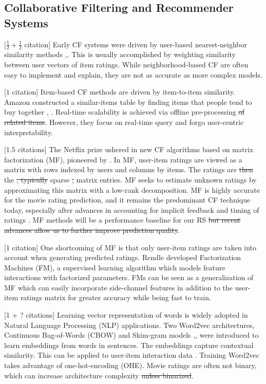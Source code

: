 \subsection{Collaborative Filtering and Recommender Systems}

[$ \frac{1}{2} + \frac{1}{2} $ citation] Early CF systems were driven by user-based nearest-neighbor similarity methods \cite{herlocker1999algorithmic},\cite{smith2017two}. This is usually accomplished by weighting similarity between user vectors of item ratings. While neighborhood-based CF are often easy to implement and explain, they are not as accurate as more complex models.

[$1$ citation] Item-based CF methods are driven by item-to-item similarity. Amazon constructed a similar-items table by finding items that people tend to buy together \cite{linden2003amazon}, \cite{smith2017two}. Real-time scalability is achieved via offline pre-processing\st{ of related items}. However, they focus on real-time query and forgo user-centric interpretability. 

[$1.5$ citations] The Netflix prize ushered in new CF algorithms based on matrix factorization (MF), pioneered by \cite{funk2006netflix}. In MF, user-item ratings are viewed as a matrix with rows indexed by users and columns by items. The ratings are \st{then} the \st{, typically} sparse \st{,} matrix entries. MF seeks to estimate unknown ratings by approximating this matrix with a low-rank decomposition. MF is highly accurate for the movie rating prediction, and it remains the predominant CF technique today, especially after advances in accounting for implicit feedback and timing of ratings \cite{koren2008factorization}. MF methods will be a performance baseline for our RS \st{but recent advances allow us to further improve prediction quality}.

[$1$ citation] One shortcoming of MF is that only user-item ratings are taken into account when generating predicted ratings. Rendle \cite{rendle2012factorization} developed Factorization Machines (FM), a supervised learning algorithm which models feature interactions with factorized parameters.  FMs can be seen as a generalization of MF which can easily incorporate side-channel features in addition to the user-item ratings matrix for greater accuracy while being fast to train.

[1 + ? citations] Learning vector representation of words is widely adopted in Natural Language Processing (NLP) applications. Two Word2vec architectures, Continuous Bag-of-Words (CBOW) and Skim-gram models \cite{mikolov2013efficient},\cite{mikolov2013distributed}, \cite{rong2014word2vec} were introduced to learn embeddings from words in sentences. The embeddings capture contextual similarity. This can be applied to user-item interaction data \cite{ozsoy2016word}. Training Word2vec takes advantage of one-hot-encoding (OHE). Movie ratings are often not binary, which can increase architecture complexity \st{unless binarized}.

